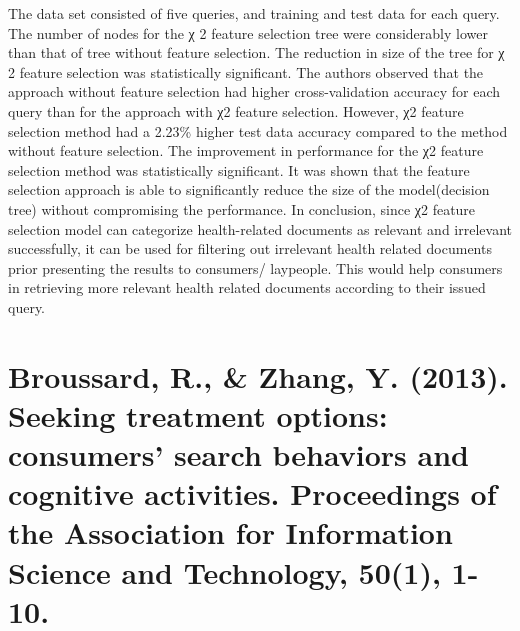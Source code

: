 \documentclass[]{article}
\begin{document}
The data set consisted of five queries, and training and test data for each query. The number of nodes for the χ 2 feature selection tree were considerably lower than that of tree without feature selection. The reduction in size of the tree for χ 2 feature selection was statistically significant. The authors observed that the approach without feature selection had higher cross-validation accuracy for each query than for the approach with χ2 feature selection. However, χ2 feature selection method had a 2.23\% higher test data accuracy compared to the method without feature selection. The improvement in performance for the χ2 feature selection method was statistically significant. It was shown that the feature selection approach is able to significantly reduce the size of the model(decision tree) without compromising the performance. In conclusion, since χ2 feature selection model can categorize health-related documents as relevant and irrelevant successfully, it can be used for filtering out irrelevant health related documents prior presenting the results to consumers/ laypeople. This would help consumers in retrieving more relevant health related documents according to their issued query.

\section{Broussard, R., \& Zhang, Y. (2013). Seeking treatment options: consumers' search behaviors and cognitive activities. Proceedings of the Association for Information Science and Technology, 50(1), 1-10.} 
\end{document}
